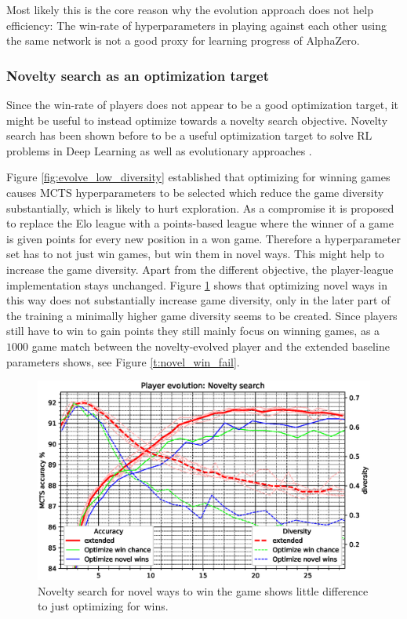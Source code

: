 \documentclass[12pt,onecolumn,oneside,titlepage]{article}
\begin{document}
Most likely this is the core reason why the evolution approach does not help efficiency: The win-rate of hyperparameters in playing against each other using the same network is not a good proxy for learning progress of AlphaZero.


\subsubsection{Novelty search as an optimization target}

Since the win-rate of players does not appear to be a good optimization target, it might be useful to instead optimize towards a novelty search objective. Novelty search has been shown before to be a useful optimization target to solve RL problems in Deep Learning as well
as evolutionary approaches \cite{lehman2011abandoning, jackson2019novelty}.

Figure \ref{fig:evolve_low_diversity} established that optimizing for winning games causes MCTS hyperparameters to be selected which reduce the game diversity substantially, which is likely to hurt exploration.
As a compromise it is proposed to replace the Elo league with a points-based league where the winner of a game is given points for every new position in a won game. Therefore a hyperparameter set has to not just win games, but win them in novel ways.
This might help to increase the game diversity. Apart from the different objective, the player-league implementation stays unchanged. Figure \ref{fig:player_evolution_win_novelty} shows that optimizing novel ways in this way does
not substantially increase game diversity, only in the later part of the training a minimally higher game diversity seems to be created. Since players still have to win to gain points they still mainly focus on winning games, as a $1000$ game match between the novelty-evolved player
and the extended baseline parameters shows, see Figure \ref{t:novel_win_fail}.

\begin{figure}[H]
\centering
\includegraphics[clip,width=\columnwidth]{player_evolution_win_novelty}
\caption{Novelty search for novel ways to win the game shows little difference to just optimizing for wins.}
\label{fig:player_evolution_win_novelty}
\end{figure}
\end{document}
